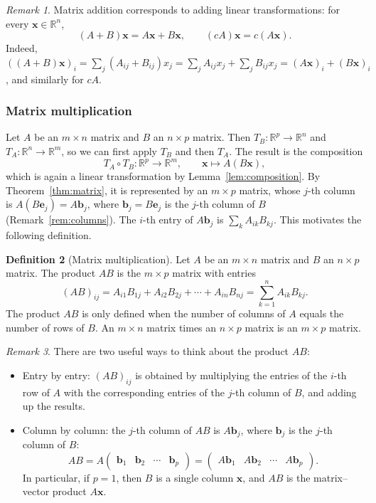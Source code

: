 \documentclass[11pt]{article}
\theoremstyle{definition}
\newtheorem{definition}{Definition}[section]
\theoremstyle{plain}
\theoremstyle{remark}
\newtheorem{remark}[definition]{Remark}
\begin{document}
\begin{remark}
    Matrix addition corresponds to adding linear transformations: for every $\mathbf{x} \in \mathbb{R}^n$,
    \[(A + B)\mathbf{x} = A\mathbf{x} + B\mathbf{x}, \qquad (cA)\mathbf{x} = c(A\mathbf{x}).\]
    Indeed, $((A + B)\mathbf{x})_i = \sum_j (A_{ij} + B_{ij}) x_j = \sum_j A_{ij} x_j + \sum_j B_{ij} x_j = (A\mathbf{x})_i + (B\mathbf{x})_i$, and similarly for $cA$.
\end{remark}

\subsubsection{Matrix multiplication}

Let $A$ be an $m \times n$ matrix and $B$ an $n \times p$ matrix. Then $T_B: \mathbb{R}^p \to \mathbb{R}^n$ and $T_A: \mathbb{R}^n \to \mathbb{R}^m$, so we can first apply $T_B$ and then $T_A$. The result is the composition
\[T_A \circ T_B: \mathbb{R}^p \to \mathbb{R}^m, \qquad \mathbf{x} \mapsto A(B\mathbf{x}),\]
which is again a linear transformation by Lemma~\ref{lem:composition}. By Theorem~\ref{thm:matrix}, it is represented by an $m \times p$ matrix, whose $j$-th column is $A(B\mathbf{e}_j) = A\mathbf{b}_j$, where $\mathbf{b}_j = B\mathbf{e}_j$ is the $j$-th column of $B$ (Remark~\ref{rem:columns}). The $i$-th entry of $A\mathbf{b}_j$ is $\sum_{k} A_{ik} B_{kj}$. This motivates the following definition.

\begin{definition}[Matrix multiplication]
    Let $A$ be an $m \times n$ matrix and $B$ an $n \times p$ matrix. The product $AB$ is the $m \times p$ matrix with entries
    \[(AB)_{ij} = A_{i1} B_{1j} + A_{i2} B_{2j} + \cdots + A_{in} B_{nj} = \sum_{k=1}^n A_{ik} B_{kj}.\]
    The product $AB$ is only defined when the number of columns of $A$ equals the number of rows of $B$. An $m \times n$ matrix times an $n \times p$ matrix is an $m \times p$ matrix.
\end{definition}

\begin{remark}\label{rem:two-views}
    There are two useful ways to think about the product $AB$:
    \begin{itemize}
        \item Entry by entry: $(AB)_{ij}$ is obtained by multiplying the entries of the $i$-th row of $A$ with the corresponding entries of the $j$-th column of $B$, and adding up the results.
        \item Column by column: the $j$-th column of $AB$ is $A\mathbf{b}_j$, where $\mathbf{b}_j$ is the $j$-th column of $B$:
        \[AB = A \begin{pmatrix} \mathbf{b}_1 & \mathbf{b}_2 & \cdots & \mathbf{b}_p \end{pmatrix} = \begin{pmatrix} A\mathbf{b}_1 & A\mathbf{b}_2 & \cdots & A\mathbf{b}_p \end{pmatrix}.\]
        In particular, if $p = 1$, then $B$ is a single column $\mathbf{x}$, and $AB$ is the matrix--vector product $A\mathbf{x}$.
    \end{itemize}
\end{remark}
\end{document}
